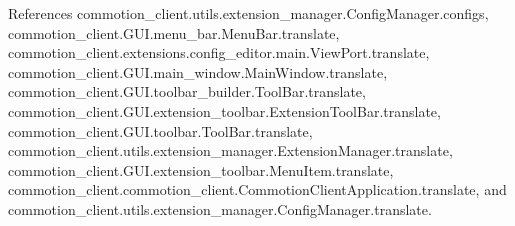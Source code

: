 References commotion\-\_\-client.\-utils.\-extension\-\_\-manager.\-Config\-Manager.\-configs, commotion\-\_\-client.\-G\-U\-I.\-menu\-\_\-bar.\-Menu\-Bar.\-translate, commotion\-\_\-client.\-extensions.\-config\-\_\-editor.\-main.\-View\-Port.\-translate, commotion\-\_\-client.\-G\-U\-I.\-main\-\_\-window.\-Main\-Window.\-translate, commotion\-\_\-client.\-G\-U\-I.\-toolbar\-\_\-builder.\-Tool\-Bar.\-translate, commotion\-\_\-client.\-G\-U\-I.\-extension\-\_\-toolbar.\-Extension\-Tool\-Bar.\-translate, commotion\-\_\-client.\-G\-U\-I.\-toolbar.\-Tool\-Bar.\-translate, commotion\-\_\-client.\-utils.\-extension\-\_\-manager.\-Extension\-Manager.\-translate, commotion\-\_\-client.\-G\-U\-I.\-extension\-\_\-toolbar.\-Menu\-Item.\-translate, commotion\-\_\-client.\-commotion\-\_\-client.\-Commotion\-Client\-Application.\-translate, and commotion\-\_\-client.\-utils.\-extension\-\_\-manager.\-Config\-Manager.\-translate.


